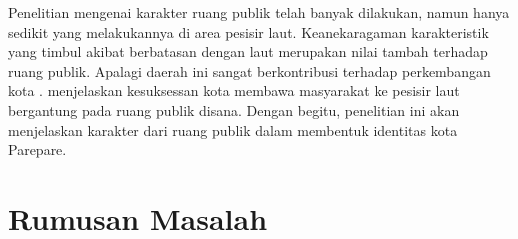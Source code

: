 \documentclass[12pt]{simart} %
\begin{document}
Penelitian mengenai karakter ruang publik telah banyak dilakukan, namun hanya sedikit yang melakukannya di area pesisir laut. Keanekaragaman karakteristik yang timbul akibat berbatasan dengan laut merupakan nilai tambah terhadap ruang publik. Apalagi daerah ini sangat berkontribusi terhadap perkembangan kota \citep{hussein2014}. \cite{hussein2014} menjelaskan kesuksessan kota membawa masyarakat ke pesisir laut bergantung pada ruang publik disana. Dengan begitu, penelitian ini akan menjelaskan karakter dari ruang publik dalam membentuk identitas kota Parepare.

\section{Rumusan Masalah}
\end{document}
